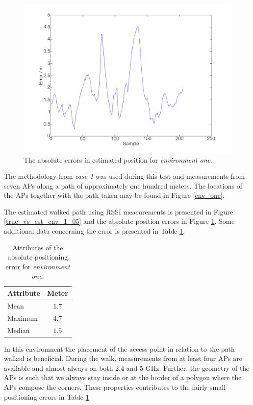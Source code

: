 \documentclass{LTHthesis}
\begin{document}
%
\begin{figure}[!hbt]

\includegraphics[width=1\textwidth ]{images/pure_rssi/error_env_1_05}
\caption{The absolute errors in estimated position for \emph{environment one}.}\label{error_env_1_05}
\end{figure}
%
The methodology from \emph{case 1} was used during this test and measurements from seven APs along a path of approximately one hundred meters. The locations of the APs together with the path taken may be found in Figure \ref{env_one}.

The estimated walked path using RSSI measurements is presented in Figure \ref{true_vs_est_env_1_05} and the absolute position errors in Figure \ref{error_env_1_05}. Some additional data concerning the error is presented in Table \ref{table:error_env-1}.
%
\begin{table}
\begin{center}
\begin{tabular}{|l|c|}
\hline
\multicolumn{1}{|c|}{Attribute} & Meter \\
\hline
\hline
Mean & $1.7$ \\
\hline
Maximum & $4.7$\\
\hline
Median & $1.5$ \\
\hline 
\end{tabular}
\end{center}
\caption{Attributes of the absolute positioning error for \emph{environment one}.}\label{table:error_env-1}
\end{table}

In this environment the placement of the access point in relation to the path walked is beneficial. During the walk, measurements from at least four APs are available and almost always on both $2.4$ and $5$ GHz.  Further, the geometry of the APs is such that we always stay inside or at the border of a polygon where the APs compose the corners. These properties contributes to the fairly small positioning errors in Table \ref{table:error_env-1}  
%
\end{document}

